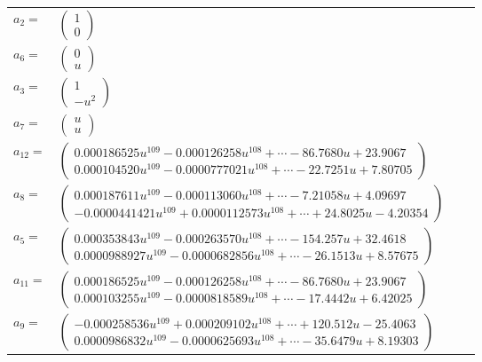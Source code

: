 \documentclass[1p]{elsarticle_modified}
\theoremstyle{definition}
\begin{document}
\begin{tabular}{m{7pt} m{180pt} m{7pt} m{180pt} }
\flushright $a_{2}=$&$\begin{pmatrix}1\\0\end{pmatrix}$ \\
\flushright $a_{6}=$&$\begin{pmatrix}0\\u\end{pmatrix}$ \\
\flushright $a_{3}=$&$\begin{pmatrix}1\\- u^2\end{pmatrix}$ \\
\flushright $a_{7}=$&$\begin{pmatrix}u\\u\end{pmatrix}$ \\
\flushright $a_{12}=$&$\begin{pmatrix}0.000186525 u^{109}-0.000126258 u^{108}+\cdots-86.7680 u+23.9067\\0.000104520 u^{109}-0.0000777021 u^{108}+\cdots-22.7251 u+7.80705\end{pmatrix}$ \\
\flushright $a_{8}=$&$\begin{pmatrix}0.000187611 u^{109}-0.000113060 u^{108}+\cdots-7.21058 u+4.09697\\-0.0000441421 u^{109}+0.0000112573 u^{108}+\cdots+24.8025 u-4.20354\end{pmatrix}$ \\
\flushright $a_{5}=$&$\begin{pmatrix}0.000353843 u^{109}-0.000263570 u^{108}+\cdots-154.257 u+32.4618\\0.0000988927 u^{109}-0.0000682856 u^{108}+\cdots-26.1513 u+8.57675\end{pmatrix}$ \\
\flushright $a_{11}=$&$\begin{pmatrix}0.000186525 u^{109}-0.000126258 u^{108}+\cdots-86.7680 u+23.9067\\0.000103255 u^{109}-0.0000818589 u^{108}+\cdots-17.4442 u+6.42025\end{pmatrix}$ \\
\flushright $a_{9}=$&$\begin{pmatrix}-0.000258536 u^{109}+0.000209102 u^{108}+\cdots+120.512 u-25.4063\\0.0000986832 u^{109}-0.0000625693 u^{108}+\cdots-35.6479 u+8.19303\end{pmatrix}$ \\

\end{tabular}
\end{document}
